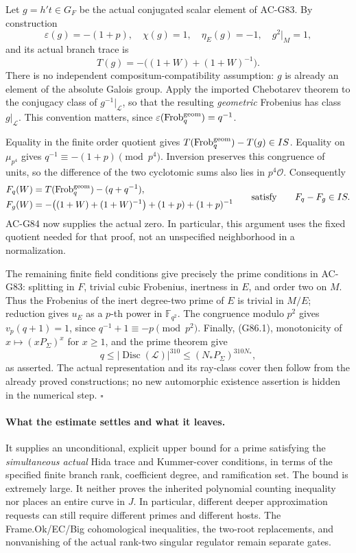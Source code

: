 Let \(g=h't\in G_F\) be the actual conjugated scalar element of AC-G83. By construction
\[
 \varepsilon(g)=-(1+p),\quad
 \chi(g)=1,\quad
 \eta_E(g)=-1,\quad
 g^2|_M=1,
\]
and its actual branch trace is
\[
 T(g)=-\bigl((1+W)+(1+W)^{-1}\bigr).
\]
There is no independent compositum-compatibility assumption: \(g\) is already an element of the absolute Galois group. Apply the imported Chebotarev theorem to the conjugacy class of \(g^{-1}|_{\mathcal L}\), so that the resulting \emph{geometric} Frobenius has class \(g|_{\mathcal L}\). This convention matters, since
\(\varepsilon(\operatorname{Frob}^{\rm geom}_q)=q^{-1}\).

Equality in the finite order quotient gives
\(T(\operatorname{Frob}^{\rm geom}_q)-T(g)\in IS\).
Equality on \(\mu_{p^4}\) gives
\(q^{-1}\equiv-(1+p)\pmod{p^4}\). Inversion preserves this congruence of units, so the difference of the two cyclotomic sums also lies in \(p^4\mathcal O\). Consequently
\[
 \begin{split}
 F_q(W)&=T(\operatorname{Frob}^{\rm geom}_q)-(q+q^{-1}),\\
 F_g(W)&=-\bigl((1+W)+(1+W)^{-1}\bigr)
                  +(1+p)+(1+p)^{-1}
 \end{split}
 \qquad\text{satisfy}\qquad F_q-F_g\in IS .
\]
AC-G84 now supplies the actual zero. In particular, this argument uses the fixed quotient needed for that proof, not an unspecified neighborhood in a normalization.

The remaining finite field conditions give precisely the prime conditions in AC-G83: splitting in \(F\), trivial cubic Frobenius, inertness in \(E\), and order two on \(M\). Thus the Frobenius of the inert degree-two prime of \(E\) is trivial in \(M/E\); reduction gives \(u_E\) as a \(p\)-th power in \(\mathbb F_{q^2}\). The congruence modulo \(p^2\) gives \(v_p(q+1)=1\), since \(q^{-1}+1\equiv-p\pmod{p^2}\).
Finally, (G86.1), monotonicity of \(x\mapsto(xP_\Sigma)^x\) for \(x\geq1\), and the prime theorem give
\[
 q\leq|\operatorname{Disc}(\mathcal L)|^{310}
       \leq(N_*P_\Sigma)^{310N_*},
\]
as asserted. The actual representation and its ray-class cover then follow from the already proved constructions; no new automorphic existence assertion is hidden in the numerical step. \(\square\)

\paragraph{What the estimate settles and what it leaves.}
It supplies an unconditional, explicit upper bound for a prime satisfying the \emph{simultaneous actual} Hida trace and Kummer-cover conditions, in terms of the specified finite branch rank, coefficient degree, and ramification set. The bound is extremely large. It neither proves the inherited polynomial counting inequality nor places an entire curve in \(J\). In particular, different deeper approximation requests can still require different primes and different hosts. The Frame.Ok/EC/Big cohomological inequalities, the two-root replacements, and nonvanishing of the actual rank-two singular regulator remain separate gates.


